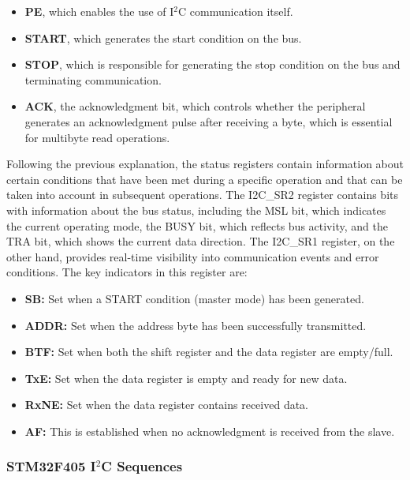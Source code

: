 \begin{itemize}
    \item \textbf{PE}, which enables the use of I$^2$C communication itself.
    \item \textbf{START}, which generates the start condition on the bus.
    \item \textbf{STOP}, which is responsible for generating the stop condition on the bus and terminating communication.
    \item \textbf{ACK}, the acknowledgment bit, which controls whether the peripheral generates an acknowledgment pulse after receiving a byte, which is essential for multibyte read operations.
\end{itemize}


Following the previous explanation, the status registers contain information about 
certain conditions that have been met during a specific operation and that can be 
taken into account in subsequent operations. The I2C\_SR2 register contains bits 
with information about the bus status, including the MSL bit, which indicates the 
current operating mode, the BUSY bit, which reflects bus activity, and the TRA 
bit, which shows the current data direction. The I2C\_SR1 register, on the other 
hand, provides real-time visibility into communication events and error conditions. 
The key indicators in this register are:

\begin{itemize}
    \item \textbf{SB:     }Set when a START condition (master mode) has been generated.
    \item \textbf{ADDR:   }Set when the address byte has been successfully transmitted.
    \item \textbf{BTF:    }Set when both the shift register and the data register are empty/full.
    \item \textbf{TxE:    }Set when the data register is empty and ready for new data.
    \item \textbf{RxNE:   }Set when the data register contains received data. 
    \item \textbf{AF:     }This is established when no acknowledgment is received from the slave.
\end{itemize}

\subsubsection{STM32F405 I$^2$C Sequences}


